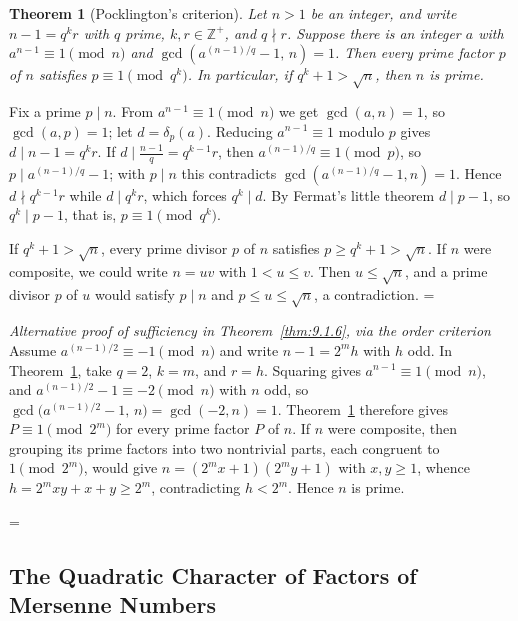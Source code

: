 \documentclass[11pt]{article}
\makeatletter
\let\nt@closedisplay\]
\def\nt@guardedclose{\@ifnextchar\par{\nt@closeafterpar}{\@ifnextchar\end{\postdisplaypenalty\@M\nt@closedisplay}{\nt@closedisplay}}}
\def\nt@closeafterpar\par{\@ifnextchar\par{\nt@closeafterpar}{\@ifnextchar\end{\postdisplaypenalty\@M\nt@closedisplay\par}{\nt@closedisplay\par}}}
\renewenvironment{proof}[1][\proofname]{\par
  \pushQED{\qed}\normalfont\topsep\medskipamount\edef\nt@afterproof{\@endparpenalty=\the\@endparpenalty\relax}\@beginparpenalty\@M\@endparpenalty\@M\let\]\nt@guardedclose\trivlist\item[]\textit{#1\@addpunct{.}} \ignorespaces}{\ifvmode\addpenalty\@M\fi\popQED\nt@afterproof\endtrivlist\@endpefalse}
\theoremstyle{ntstyle}
\newtheorem{theorem}{Theorem}[subsection]
\newenvironment{altproof}[1][\proofname]
  {\begin{proof}[#1]\renewcommand{\qedsymbol}{}}{\end{proof}}
\makeatother
\begin{document}
\begin{theorem}[Pocklington's criterion]\label{thm:9.1.9}\label{thm:pocklington-criterion}
  Let
  $n>1$ be an integer, and write $n-1=q^{k}r$ with $q$ prime,
  $k,r\in\mathbb{Z}^+$, and $q\nmid r$. Suppose there is an
  integer $a$ with $a^{n-1}\equiv1\pmod{n}$ and
  $\gcd\left(a^{(n-1)/q}-1,\,n\right)=1$. Then every prime factor $p$
  of $n$ satisfies $p\equiv1\pmod{q^{k}}$.
  In particular, if $q^k+1>\sqrt n$, then $n$ is prime.

\end{theorem}

\begin{proof} Fix a prime $p\mid n$. From
  $a^{n-1}\equiv1\pmod{n}$ we get $\gcd(a, n)=1$, so $\gcd(a, p)=1$; let
  $d=\delta_p(a)$. Reducing $a^{n-1}\equiv1$ modulo $p$
  gives $d\mid n-1=q^{k}r$. If $d\mid\tfrac{n-1}{q}=q^{k-1}r$, then
  $a^{(n-1)/q}\equiv1\pmod{p}$, so $p\mid a^{(n-1)/q}-1$; with $p\mid n$
  this contradicts $\gcd(a^{(n-1)/q}-1, n)=1$. Hence $d\nmid q^{k-1}r$
  while $d\mid q^{k}r$, which forces $q^{k}\mid d$. By Fermat's little
  theorem $d\mid p-1$, so $q^{k}\mid p-1$, that is, $p\equiv1\pmod{q^{k}}$.

  If $q^k+1>\sqrt n$, every prime divisor $p$ of $n$ satisfies
  $p\ge q^k+1>\sqrt n$. If $n$ were composite, we could write $n=uv$
  with $1<u\le v$. Then $u\le\sqrt n$, and a prime divisor
  $p$ of $u$ would satisfy $p\mid n$ and $p\le u\le\sqrt n$,
  a contradiction.
\end{proof}

\begin{altproof}[Alternative proof of sufficiency in Theorem~\ref{thm:9.1.6}, via the order criterion] Assume $a^{(n-1)/2}\equiv-1\pmod{n}$ and write $n-1=2^{m}h$
  with $h$ odd. In Theorem~\ref{thm:9.1.9}, take $q=2$, $k=m$, and
  $r=h$. Squaring
  gives $a^{n-1}\equiv1\pmod{n}$, and $a^{(n-1)/2}-1\equiv-2\pmod{n}$ with
  $n$ odd, so $\gcd\big(a^{(n-1)/2}-1,\,n\big)=\gcd(-2,n)=1$. Theorem~\ref{thm:9.1.9} therefore gives
  $P\equiv1\pmod{2^{m}}$ for every prime factor $P$
  of $n$. If $n$ were composite, then grouping its prime factors into two
  nontrivial parts, each congruent to $1\pmod{2^{m}}$, would give
  $n=(2^{m}x+1)(2^{m}y+1)$ with $x,y\ge1$, whence
  $h=2^{m}xy+x+y\ge2^{m}$, contradicting $h<2^{m}$. Hence $n$ is prime.

\end{altproof}
\subsection{The Quadratic Character of Factors of Mersenne Numbers}
\end{document}
